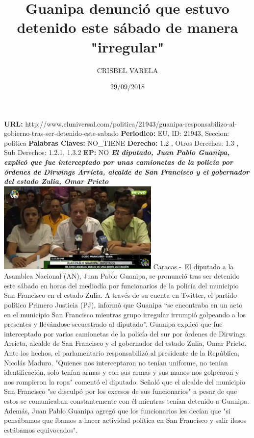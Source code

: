 \documentclass{article}%
\title{\textbf{Guanipa denunció que estuvo detenido este sábado de manera "irregular"}}%
\author{CRISBEL VARELA}%
\date{29/09/2018}%
\begin{document}
%
\normalsize%
\maketitle%
\textbf{URL: }%
http://www.eluniversal.com/politica/21943/guanipa{-}responsabilizo{-}al{-}gobierno{-}tras{-}ser{-}detenido{-}este{-}sabado\newline%
%
\textbf{Periodico: }%
EU, %
ID: %
21943, %
Seccion: %
politica\newline%
%
\textbf{Palabras Claves: }%
NO\_TIENE\newline%
%
\textbf{Derecho: }%
1.2%
, Otros Derechos: %
1.3%
, Sub Derechos: %
1.2.1, 1.3.2%
\newline%
%
\textbf{EP: }%
NO\newline%
\newline%
%
\textbf{\textit{El diputado, Juan Pablo Guanipa, explicó que fue interceptado por unas camionetas de la policía por órdenes de Dirwings Arrieta, alcalde de San Francisco y el gobernador del estado Zulia, Omar Prieto}}%
\newline%
\newline%
%
\includegraphics[width=300px]{28.jpg}%
\newline%
%
Caracas.{-}~El diputado a la Asamblea Nacional (AN), Juan Pablo Guanipa, se pronunció tras ser detenido este sábado en horas del mediodía por funcionarios de la policía del municipio San Francisco en el estado Zulia.%
\newline%
%
A través de su cuenta en Twitter, el partido político Primero Justicia (PJ), informó que Guanipa “se encontraba en un acto en el municipio San Francisco mientras grupo irregular irrumpió golpeando a los presentes y llevándose secuestrado al diputado”.%
\newline%
%
Guanipa explicó que fue interceptado por varias camionetas de la policía del sur por órdenes de Dirwings Arrieta, alcalde de San Francisco y el gobernador del estado Zulia, Omar Prieto.%
\newline%
%
Ante los hechos, el parlamentario responsabilizó al presidente de la República, Nicolás Maduro.%
\newline%
%
"Quienes nos interceptaron no tenían uniforme, no tenían identificación, solo tenían armas y con sus armas y sus manos nos golpearon y nos rompieron la ropa" comentó el diputado.%
\newline%
%
Señaló que el alcalde del municipio San Francisco "se disculpó por los excesos de sus funcionarios" a pesar de que estos se comunicaban constantemente con él mientras tenían detenido a Guanipa.%
\newline%
%
Además, Juan Pablo Guanipa agregó que los funcionarios les decían que "si pensábamos que íbamos a hacer actividad política en San Francisco y salir ilesos estábamos equivocados".%
\newline%
%
\end{document}
